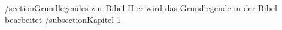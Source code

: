/section{Grundlegendes zur Bibel}
Hier wird das Grundlegende in der Bibel bearbeitet
/subsection{Kapitel 1}